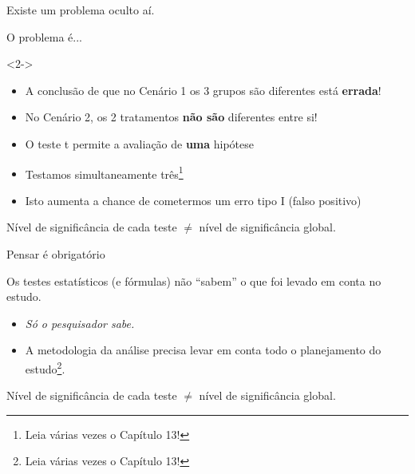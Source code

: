 \documentclass{beamer}
\begin{document}
\begin{frame}{\scriptsize }
  \begin{center}
    Existe um problema oculto aí.
  \end{center}
\end{frame}

\begin{frame}{\scriptsize }
  \begin{center}
    O problema é...
  \end{center}
  \begin{block}{}<2->
    \begin{itemize}
      \footnotesize
    \item A conclusão de que no Cenário 1 os 3 grupos são diferentes está {\bf errada}!
    \item No Cenário 2, os 2 tratamentos {\bf não são} diferentes entre si!
    \end{itemize}
  \end{block}
  \bigskip
  \begin{itemize}
    \scriptsize
  \item<3-> O teste t permite a avaliação de {\bf uma} hipótese
  \item<3-> Testamos simultaneamente três\footnote{Leia várias vezes o Capítulo 13!}
  \item<3-> Isto aumenta a chance de cometermos um erro tipo I (falso positivo)
  \end{itemize}
  \vfill
  \begin{block}{}
    \footnotesize
    { Nível de significância de cada teste $\ne$ nível de significância global.}
  \end{block}
\end{frame}

\begin{frame}{\scriptsize Pensar é obrigatório}
  \begin{block}{}
    \small
    Os testes estatísticos (e fórmulas) não ``sabem'' o que foi levado em conta no estudo.
  \end{block}
  \bigskip
  \bigskip
  \begin{itemize}
    \footnotesize
  \item {\em Só o pesquisador sabe.}
  \item A metodologia da análise precisa levar em conta todo o planejamento do estudo\footnote{Leia várias vezes o Capítulo 13!}.
  \end{itemize}
  \bigskip
  \bigskip
  \bigskip
  \begin{block}{}
    \footnotesize
    {Nível de significância de cada teste $\ne$ nível de significância global.}
  \end{block}
\end{frame}
\end{document}
